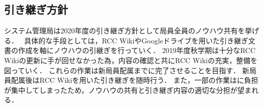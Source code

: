 \subsection*{引き継ぎ方針}

システム管理局は2020年度の引き継ぎ方針として局員全員のノウハウ共有を挙げる．　
具体的な手段としては，RCC WikiやGoogleドライブを用いた引き継ぎ文書の作成を軸にノウハウの引継ぎを行っていく．
2019年度秋学期は十分なRCC Wikiの更新に手が回せなかった為，内容の確認と共にRCC Wikiの充実，整備を図っていく．
これらの作業は新局員配属までに完了させることを目指す．
新局員配属後はRCC Wikiを用いた引き継ぎを随時行う．
また，一部の作業は\thirdGrade{}に負担が集中してしまったため，ノウハウの共有と引き継ぎ内容の適切な分担が望まれる．